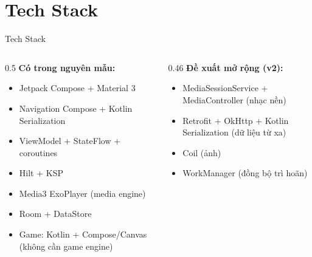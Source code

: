 \documentclass[aspectratio=169]{beamer}
\begin{document}
\section{Tech Stack}
\begin{frame}{Tech Stack}
  \small
  \begin{columns}
    \begin{column}{0.5\textwidth}
      \textbf{Có trong nguyên mẫu:}
      \begin{itemize}\small
        \item Jetpack Compose + Material 3
        \item Navigation Compose + Kotlin Serialization
        \item ViewModel + StateFlow + coroutines
        \item Hilt + KSP
        \item Media3 ExoPlayer (media engine)
        \item Room + DataStore
        \item Game: Kotlin + Compose/Canvas (không cần game engine)
      \end{itemize}
    \end{column}
    \begin{column}{0.46\textwidth}
      \textbf{Đề xuất mở rộng (v2):}
      \begin{itemize}\small
        \item MediaSessionService + MediaController (nhạc nền)
        \item Retrofit + OkHttp + Kotlin Serialization (dữ liệu từ xa)
        \item Coil (ảnh)
        \item WorkManager (đồng bộ trì hoãn)
      \end{itemize}
    \end{column}
  \end{columns}
\end{frame}

\end{document}

